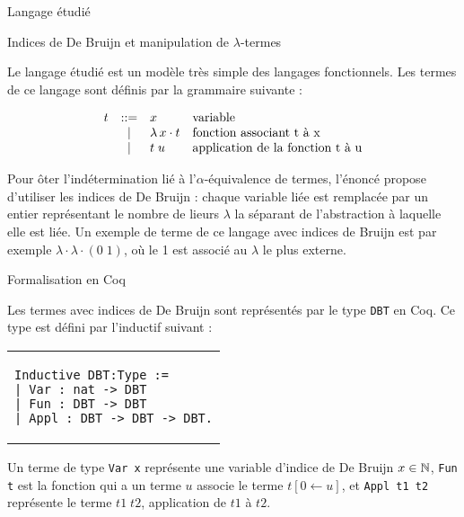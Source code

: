 \documentclass[a4paper,twoside,12pt]{article}
\begin{document}
\begin{partie}{Langage étudié}

\begin{sous-partie}{Indices de De Bruijn et manipulation de $\lambda$-termes}

\begin{paragraph}{}
Le langage étudié est un modèle très simple des langages fonctionnels. Les termes de ce langage sont définis par la grammaire suivante :
\end{paragraph}
$$\begin{array}{rcll}
t&::=&x&\mbox{variable}\\
&|&\lambda\,x\cdot t&\mbox{fonction associant t à x}\\
&|&t\;u&\mbox{application de la fonction t à u}
\end{array}$$
\begin{paragraph}{}
Pour ôter l'indétermination lié à l'$\alpha$-équivalence de termes, l'énoncé propose d'utiliser les indices de De Bruijn : chaque variable liée est remplacée par un entier représentant le nombre de lieurs $\lambda$ la séparant de l'abstraction à laquelle elle est liée. Un exemple de terme de ce langage avec indices de Bruijn est par exemple $\lambda\cdot\lambda\cdot(0\;1)$, où le 1 est associé au $\lambda$ le plus externe.
\end{paragraph}

\end{sous-partie}

\begin{sous-partie}{Formalisation en Coq}

\begin{paragraph}{}
Les termes avec indices de De Bruijn sont représentés par le type \verb|DBT| en Coq. Ce type est défini par l'inductif suivant :
\end{paragraph}\vspace{-0.8cm}
\begin{center}
\begin{tabular}{p{5cm}}
\begin{verbatim}
Inductive DBT:Type :=
| Var : nat -> DBT
| Fun : DBT -> DBT
| Appl : DBT -> DBT -> DBT.
\end{verbatim}
\end{tabular}
\end{center}\vspace{-1cm}
\begin{paragraph}{}
Un terme de type \verb|Var x| représente une variable d'indice de De Bruijn $x\in\mathbb{N}$, \verb|Fun t| est la fonction qui a un terme $u$ associe le terme $t[0\leftarrow u]$, et \verb|Appl t1 t2| représente le terme $t1\;t2$, application de $t1$ à $t2$.
\end{paragraph}


\end{sous-partie}
\end{partie}
\end{document}
